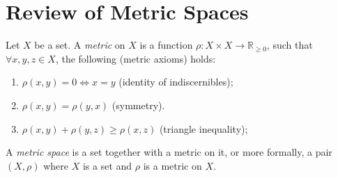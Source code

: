 \section{Review of Metric Spaces}


\begin{definition}
	Let $X$ be a set. A \textit{metric} on $X$ is a function $\rho: X \times X \to \mathbb R_{\ge 0}$, such that $\forall x, y, z \in X$, the following (metric axioms) holds:
	\begin{enumerate}[M1.]
		\item $\rho(x,y) = 0 \iff x = y$ (identity of indiscernibles);
		\item $\rho(x,y) = \rho(y,x)$ (symmetry).
		\item $\rho(x,y) + \rho(y,z) \ge \rho(x,z)$ (triangle inequality);
	\end{enumerate}
	A \textit{metric space} is a set together with a metric on it, or more formally, a pair $(X,\rho)$ where $X$ is a set and $\rho$ is a metric on $X$.
\end{definition}


